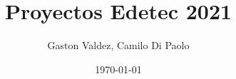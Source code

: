 \documentclass[12pt,a4paper,oneside]{report}
\author{Gaston Valdez, Camilo Di Paolo}
\title{Proyectos Edetec 2021 }
\date{\today}
\begin{document}
\renewcommand{\chaptername}{}
\renewcommand{\tablename}{Tabla} 
	

	\maketitle
	
	
\end{document}
